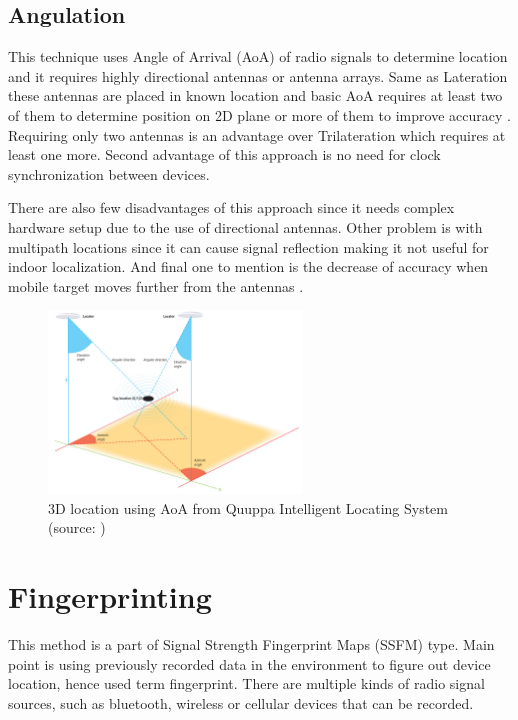 \subsection{Angulation}\label{sec:Angulation}
This technique uses Angle of Arrival (AoA) of radio signals to determine location and it requires highly directional antennas or antenna arrays. Same as Lateration these antennas are placed in known location and basic AoA requires at least two of them to determine position on 2D plane or more of them to improve accuracy \cite{RAinWILTaS}. Requiring only two antennas is an advantage over Trilateration which requires at least one more. Second advantage of this approach is no need for clock synchronization between devices.

There are also few disadvantages of this approach since it needs complex hardware setup due to the use of directional antennas. Other problem is with multipath locations since it can cause signal reflection making it not useful for indoor localization. And final one to mention is the decrease of accuracy when mobile target moves further from the antennas \cite{AoA, RofAoA}.

\begin{figure}[h!]
	\begin{centering}
		\includegraphics[width=0.6\textwidth]{img/angulation}
		\par\end{centering}
	\caption{3D location using AoA from Quuppa Intelligent Locating System (source: \cite{QAoA})\label{fig:AoAQuuppa}}
	\label{fig03c02}
\end{figure}

\section{Fingerprinting}\label{sec:Fingerprinting}
This method is a part of Signal Strength Fingerprint Maps (SSFM) type. Main point is using previously recorded data in the environment to figure out device location, hence used term fingerprint. There are multiple kinds of radio signal sources, such as bluetooth, wireless or cellular devices that can be recorded.


